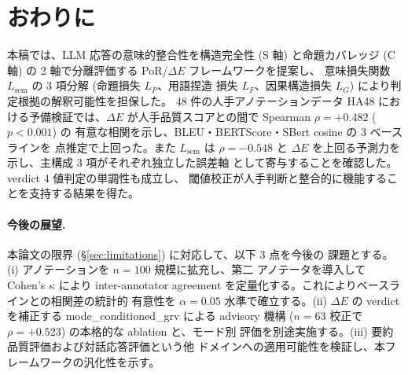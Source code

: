 %

\section{おわりに}
\label{sec:conclusion}

本稿では、LLM 応答の意味的整合性を構造完全性 (S 軸) と命題カバレッジ
(C 軸) の 2 軸で分離評価する PoR/$\Delta E$ フレームワークを提案し、
意味損失関数 $L_{\mathrm{sem}}$ の 3 項分解 (命題損失 $L_P$、用語捏造
損失 $L_F$、因果構造損失 $L_G$) により判定根拠の解釈可能性を担保した。
48 件の人手アノテーションデータ HA48 における予備検証では、$\Delta E$
が人手品質スコアとの間で Spearman $\rho = +0.482$ ($p < 0.001$) の
有意な相関を示し、BLEU・BERTScore・SBert cosine の 3 ベースラインを
点推定で上回った。また $L_{\mathrm{sem}}$ は $\rho = -0.548$ と
$\Delta E$ を上回る予測力を示し、主構成 3 項がそれぞれ独立した誤差軸
として寄与することを確認した。verdict 4 値判定の単調性も成立し、
閾値校正が人手判断と整合的に機能することを支持する結果を得た。

\paragraph{今後の展望.}
本論文の限界 (\S\ref{sec:limitations}) に対応して、以下 3 点を今後の
課題とする。(i) アノテーションを $n = 100$ 規模に拡充し、第二
アノテータを導入して Cohen's $\kappa$ により inter-annotator
agreement を定量化する。これによりベースラインとの相関差の統計的
有意性を $\alpha = 0.05$ 水準で確立する。(ii) $\Delta E$ の verdict
を補正する mode\_conditioned\_grv による advisory 機構
($n = 63$ 校正で $\rho = +0.523$) の本格的な ablation と、モード別
評価を別途実施する。(iii) 要約品質評価および対話応答評価という他
ドメインへの適用可能性を検証し、本フレームワークの汎化性を示す。


